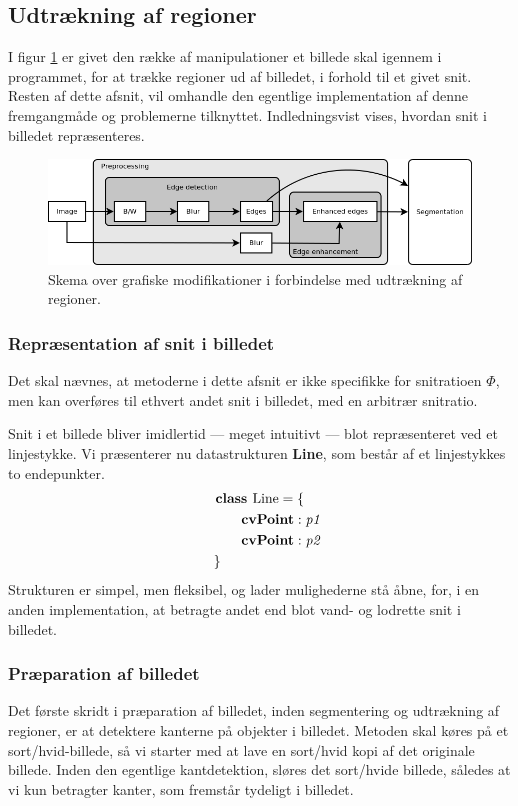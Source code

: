 {\subsection{Udtrækning af regioner}
I figur \ref{graphic_pipeline} er givet den række af manipulationer et billede
skal igennem i programmet, for at trække regioner ud af billedet, i
forhold til et givet snit. Resten af dette afsnit, vil omhandle den
egentlige implementation af denne fremgangmåde og problemerne
tilknyttet.  Indledningsvist vises, hvordan snit i billedet
repræsenteres.
\begin{figure}[!h]
    \includegraphics[width=\textwidth]{afsnit/implementation/billeder/billedbehandling/pipeline.png}
    \caption{Skema over grafiske modifikationer i forbindelse med
    udtrækning af regioner.}
    \label{graphic_pipeline}
\end{figure}

\subsubsection{Repræsentation af snit i billedet}
Det skal nævnes, at metoderne i dette afsnit er ikke
specifikke for snitratioen $\varPhi$, men kan overføres til ethvert
andet snit i billedet, med en arbitrær snitratio.

Snit i et billede bliver imidlertid --- meget intuitivt --- blot
repræsenteret ved et linjestykke. Vi præsenterer nu datastrukturen
\textbf{Line}, som består af et linjestykkes to endepunkter.
\begin{multline}
    \textbf{class~} \textrm{Line} = \{ \\
    \shoveleft{\qquad\textbf{cvPoint} : \textit{p1}} \\
    \shoveleft{\qquad\textbf{cvPoint} : \textit{p2}} \\
    \shoveleft{\}}\shoveright{}
    \label{Line_class}
\end{multline}
Strukturen er simpel, men fleksibel, og lader mulighederne stå åbne,
for, i en anden implementation, at betragte andet end blot vand- og
lodrette snit i billedet.

\subsubsection{Præparation af billedet}
Det første skridt i præparation af billedet, inden segmentering og
udtrækning af regioner, er at detektere kanterne på objekter i billedet.
Metoden skal køres på et sort/hvid-billede, så vi starter med at lave en
sort/hvid kopi af det originale billede. Inden den egentlige
kantdetektion, sløres det sort/hvide billede, således at vi kun
betragter kanter, som fremstår tydeligt i billedet.

}
